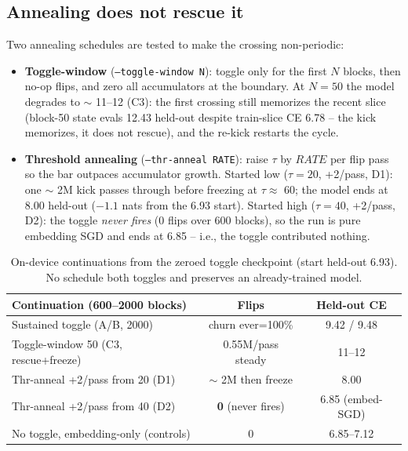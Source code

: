 \documentclass{article} %
\begin{document}
\subsection{Annealing does not rescue it}
\label{sec:anneal}

Two annealing schedules are tested to make the crossing non-periodic:

\begin{itemize}
\item \textbf{Toggle-window} (\texttt{--toggle-window N}): toggle only for the first $N$ blocks, then no-op flips, and zero all accumulators at the boundary. At $N=50$ the model degrades to $\sim$ 11--12 (C3): the first crossing still memorizes the recent slice (block-50 state evals 12.43 held-out despite train-slice CE 6.78 -- the kick memorizes, it does not rescue), and the re-kick restarts the cycle.
\item \textbf{Threshold annealing} (\texttt{--thr-anneal RATE}): raise $\tau$ by $RATE$ per flip pass so the bar outpaces accumulator growth. Started low ($\tau=20$, +2/pass, D1): one $\sim$ 2M kick passes through before freezing at $\tau\approx$ 60; the model ends at 8.00 held-out ($-1.1$ nats from the 6.93 start). Started high ($\tau=40$, +2/pass, D2): the toggle \emph{never fires} (0 flips over 600 blocks), so the run is pure embedding SGD and ends at 6.85 -- i.e., the toggle contributed nothing.
\end{itemize}

\begin{table}[t]
\caption{On-device continuations from the zeroed toggle checkpoint (start held-out 6.93). No schedule both toggles and preserves an already-trained model.}
\label{tab:anneal}
\begin{center}
\begin{tabular}{lcc}
\toprule
Continuation (600--2000 blocks) & Flips & Held-out CE \\
\midrule
Sustained toggle (A/B, 2000)        & churn ever=100\% & 9.42 / 9.48 \\
Toggle-window 50 (C3, rescue+freeze)& 0.55M/pass steady & 11--12 \\
Thr-anneal +2/pass from 20 (D1)     & $\sim$ 2M then freeze & 8.00 \\
Thr-anneal +2/pass from 40 (D2)     & \textbf{0} (never fires) & 6.85 (embed-SGD) \\
No toggle, embedding-only (controls)& 0 & 6.85--7.12 \\
\bottomrule
\end{tabular}
\end{center}
\end{table}
\end{document}
